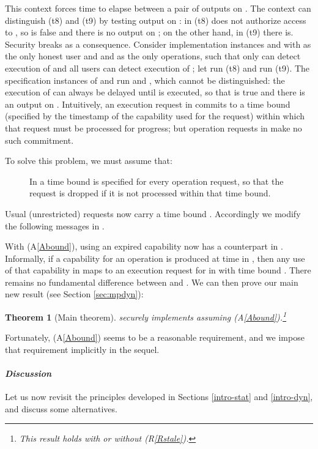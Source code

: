 \documentclass[10pt]{article}
\makeatletter
\newtheorem{theorem}{Theorem}
\newcounter{Cassums}
\newcommand{\A}{\addtocounter{Cassums}{1}A\arabic{Cassums}\gdef\@currentlabel{\arabic{Cassums}}}
\makeatother
\begin{document}
\begin{description}
\item 


\end{description}
This context forces time to elapse between a pair of outputs on . The context can distinguish (t8) and (t9) by testing output on : in (t8)  does not authorize access to , so  is false and there is no output on ; on the other hand, in (t9) there is. Security breaks as a consequence. Consider implementation instances  and  with  as the only honest user and  and  as the only operations, such that only  can detect execution of  and all users can detect execution of ; let  run (t8) and  run (t9). The specification instances of  and  run  and , which cannot be distinguished: the execution of  can always be delayed until  is executed, so that  is true and there is an output on . Intuitively, an execution request in  commits to a time bound (specified by the timestamp of the capability used for the request) within which that request must be processed for progress; but operation requests in  make no such commitment. 

To solve this problem, we must assume that:
\begin{description}
\item[\A]\label{Abound} In  a time bound is specified for every operation request, so that the request is dropped if it is not processed within that time bound. 
\end{description}
Usual (unrestricted) requests now carry a time bound . Accordingly we modify the following messages in .

With (A\ref{Abound}), using an expired capability now has a counterpart in . Informally, if a capability for an operation  is produced at time  in , then any use of that capability in  maps to an execution request for  in  with time bound . There remains no fundamental difference between  and . 
We can then prove our main new result (see Section \ref{sec:mpdyn}):
\begin{theorem}[Main theorem]  securely implements  assuming {\rm (A\ref{Abound})}.\footnote{This result holds with or without (R\ref{Rstale}).}
\end{theorem}
\noindent 
Fortunately, (A\ref{Abound}) seems to be a reasonable requirement, and we impose that requirement implicitly in the sequel. 

\paragraph{\em Discussion}
Let us now revisit the principles developed in Sections \ref{intro-stat} and \ref{intro-dyn}, and discuss some alternatives.
\end{document}
